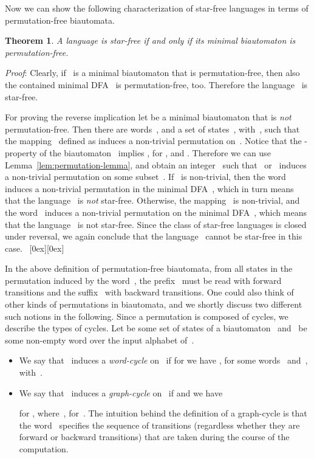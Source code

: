 \documentclass[submission]{eptcs}
\newcommand{\dfa}{\textrm{DFA}}
\newcommand*{\qed}{\raisebox{0.5ex}[0ex][0ex]{\framebox[1ex][l]{}}}
\newtheorem{theorem}{Theorem}
\newenvironment{proof}{\par\noindent
  {\rmfamily\itshape\mdseries Proof\/}:\hspace{\labelsep}\ignorespaces}{\mbox{}\nolinebreak\hfill~{\qed}
  \medbreak
}
\begin{document}
Now we can show the following characterization of star-free languages
in terms of permutation-free biautomata.

\begin{theorem}\label{thm:star-free-permutation-free}
  A language is star-free if and only if its \emph{minimal}
  biautomaton is permutation-free.
\end{theorem}

\begin{proof}
  Clearly, if~ is a minimal biautomaton that is permutation-free,
  then also the contained minimal \dfa~ is permutation-free,
  too.  Therefore the language~ is star-free.  

  For proving the reverse implication let
   be a minimal biautomaton that is
  \emph{not} permutation-free.  Then there are words~,
  and a set of states~, with~, such that
  the mapping~ defined as  induces a non-trivial permutation on~.  Notice that the
  -property of the biautomaton~ implies
  , for ,
  and .  Therefore we can use
  Lemma~\ref{lem:permutation-lemma}, and obtain an integer~
  such that~ or~ induces a non-trivial permutation
  on some subset~.  If~ is non-trivial, then
  the word~ induces a non-trivial permutation in the minimal
  \dfa~, which in turn means that the language~ is
  \emph{not} star-free.  Otherwise, the mapping~ is
  non-trivial, and the word~ induces a non-trivial permutation on
  the minimal \dfa~, which means that the language~ is
  not star-free.  Since the class of star-free languages is closed
  under reversal, we again conclude that the language~ cannot be
  star-free in this case.
\end{proof}

In the above definition of permutation-free biautomata, from all
states in the permutation induced by the word~, the prefix~
must be read with forward transitions and the suffix~ with backward
transitions.  
One could also think of other kinds of permutations in biautomata, and
we shortly discuss two different such notions in the following.  Since
a permutation is composed of cycles, we describe the types of cycles.
Let  be some set of states of a
biautomaton~ and~ be some non-empty word over the input alphabet
of~.
\begin{itemize}
\item We say that~ induces a \emph{word-cycle} on~ if for  we have , for
  some words~ and~, with~.
\item We say that~ induces a \emph{graph-cycle} on~ if
   and we have

for , where~,
  for~. The intuition behind the definition of a
  graph-cycle is that the word~ specifies the sequence of
  transitions (regardless whether they are forward or backward
  transitions) that are taken during the course of the computation.
\end{itemize}
\end{document}
